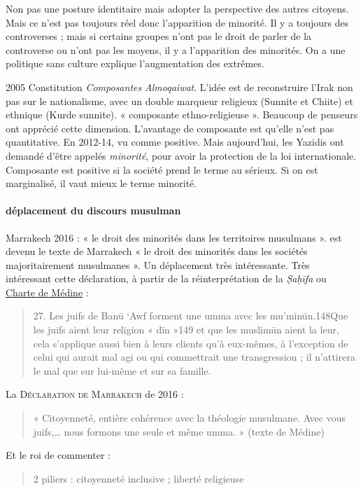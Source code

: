 Non pas une posture identitaire mais adopter la perspective des autres citoyens. Mais ce n’est pas toujours réel donc l’apparition de minorité. Il y a toujours des controverses ; mais si certains groupes n’ont pas le droit de parler de la controverse ou n’ont pas les moyens, il y a l’apparition des minorités.
On a une politique sans culture explique l’augmentation des extrêmes. 

\begin{Ex}[Irak]
2005 Constitution
\textit{Composantes} \textit{Almoqaiwat}. 
L’idée est de reconstruire l’Irak non pas sur le nationalisme, avec un double marqueur religieux (Sunnite et Chiite) et ethnique (Kurde sunnite). « composante ethno-religieuse ».
Beaucoup de penseurs ont apprécié cette dimension. L’avantage de composante est qu’elle n’est pas quantitative.
En 2012-14, vu comme positive. Mais aujourd’hui, les Yazidis ont demandé d’être appelés \textit{minorité}, pour avoir la protection de la loi internationale. Composante est positive si la société prend le terme au sérieux. Si on est marginalisé, il vaut mieux le terme minorité. 
\end{Ex}
\paragraph{déplacement du discours musulman}
Marrakech 2016 : « le droit des minorités dans les territoires musulmans ». est devenu le texte de Marrakech « le droit des minorités dans les sociétés majoritairement musulmanes ». Un déplacement très intéressante.
Très intéressant cette déclaration, à partir de la réinterprétation de la \textit{Ṣaḥīfa} ou \href{https://theses.hal.science/tel-02079610/document}{Charte de Médine} : 

\begin{quote}
    27. Les juifs de Banū ‘Awf forment une umma avec les mu’minūn.148Que les juifs aient leur religion
« dīn »149 et que les muslimūn aient la leur, cela s’applique aussi bien à leurs clients qu’à eux-mêmes, à l’exception de celui qui aurait mal agi ou qui commettrait une transgression ; il n’attirera le mal que sur lui-même et sur sa famille.
\end{quote}

La \textsc{Déclaration de Marrakech} de 2016 : 
\begin{quote}

« Citoyenneté, entière cohérence avec la théologie musulmane. Avec vous juifs,… nous formons une seule et même umma. » (texte de Médine)
\end{quote}
Et le roi de commenter : 
\begin{quote}
2 piliers : citoyenneté inclusive ; liberté religieuse
\end{quote}


